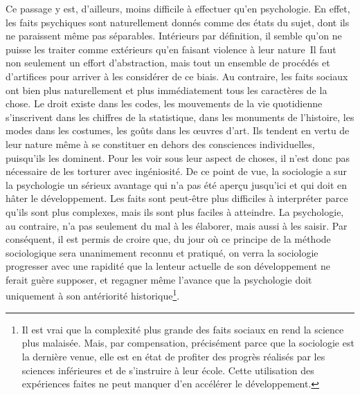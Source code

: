 \documentclass[french,twoside]{book} %
\begin{document}
Ce passage y est, d’ailleurs, moins difficile à effectuer qu’en psychologie. En effet, les faits psychiques sont naturellement donnés comme des états du sujet, dont ils ne paraissent même pas séparables. Intérieurs par définition, il semble qu’on ne puisse les traiter comme extérieurs qu’en faisant violence à leur nature Il faut non seulement un effort d’abstraction, mais tout un ensemble de procédés et d’artifices pour arriver à les considérer de ce biais. Au contraire, les faits sociaux ont bien plus naturellement et plus immédiatement tous les caractères de la chose. Le droit existe dans les codes, les mouvements de la vie quotidienne s’inscrivent dans les chiffres de la statistique, dans les monuments de l’histoire, les modes dans les costumes, les goûts dans les œuvres d’art. Ils tendent en vertu de leur nature même à se constituer en dehors des consciences individuelles, puisqu’ils les dominent. Pour les voir sous leur aspect de choses, il n’est donc pas nécessaire de les torturer avec ingéniosité. De ce point de vue, la sociologie a sur la psychologie un sérieux avantage qui n’a pas été aperçu jusqu’ici et qui doit en hâter le développement. Les faits sont peut-être plus difficiles à interpréter parce qu’ils sont plus complexes, mais ils sont plus faciles à atteindre. La psychologie, au contraire, n’a pas seulement du mal à les élaborer, mais aussi à les saisir. Par conséquent, il est permis de croire que, du jour où ce principe de la méthode sociologique sera unanimement reconnu et pratiqué, on verra la sociologie progresser avec une rapidité que la lenteur actuelle de son développement ne ferait guère supposer, et regagner même l’avance que la psychologie doit uniquement à son antériorité historique\footnote{ Il est vrai que la complexité plus grande des faits sociaux en rend la science plus malaisée. Mais, par compensation, précisément parce que la sociologie est la dernière venue, elle est en état de profiter des progrès réalisés par les sciences inférieures et de s’instruire à leur école. Cette utilisation des expériences faites ne peut manquer d’en accélérer le développement.}.
\end{document}
